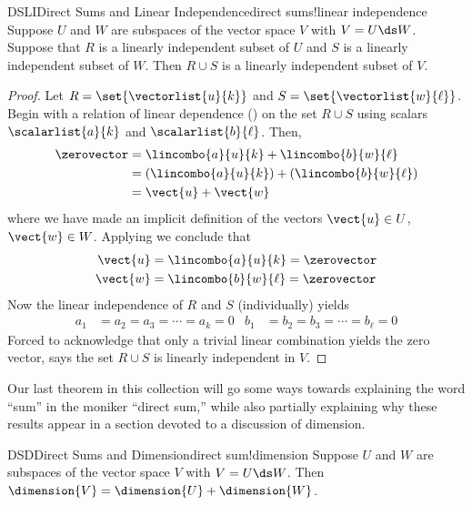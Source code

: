 %
\begin{theorem}{DSLI}{Direct Sums and Linear Independence}{direct sums!linear independence}
Suppose $U$ and $W$ are subspaces of the vector space $V$ with $V=U\ds W$.  Suppose that $R$ is a linearly independent subset of $U$ and $S$ is a linearly independent subset of $W$.  Then $R\cup S$ is a linearly independent subset of $V$.
\end{theorem}
%
\begin{proof}
Let $R=\set{\vectorlist{u}{k}}$ and $S=\set{\vectorlist{w}{\ell}}$.  Begin with a relation of linear dependence () on the set $R\cup S$ using scalars $\scalarlist{a}{k}$ and $\scalarlist{b}{\ell}$.  Then,
%
\begin{align*}
\zerovector
&=
\lincombo{a}{u}{k}
+
\lincombo{b}{w}{\ell}\\
&=
\left(\lincombo{a}{u}{k}\right)
+
\left(\lincombo{b}{w}{\ell}\right)\\
&=\vect{u}+\vect{w}
\end{align*}
%
where we have made an implicit definition of the vectors $\vect{u}\in U$, $\vect{w}\in W$.  Applying  we conclude that
%
\begin{align*}
\vect{u}&=\lincombo{a}{u}{k}=\zerovector\\
\vect{w}&=\lincombo{b}{w}{\ell}=\zerovector
\end{align*}
%
Now the linear independence of $R$ and $S$ (individually) yields
%
\begin{align*}
a_1&=a_2=a_3=\cdots=a_k=0
&
b_1&=b_2=b_3=\cdots=b_\ell=0
\end{align*}
%
Forced to acknowledge that only a trivial linear combination yields the zero vector,  says the set $R\cup S$ is linearly independent in $V$.
%
\end{proof}
%
Our last theorem in this collection will go some ways towards explaining the word ``sum'' in the moniker ``direct sum,''  while also partially explaining why these results appear in a section devoted to a discussion of dimension.
%
\begin{theorem}{DSD}{Direct Sums and Dimension}{direct sum!dimension}
Suppose $U$ and $W$ are subspaces of the vector space $V$ with $V=U\ds W$.  Then $\dimension{V}=\dimension{U}+\dimension{W}$.
\end{theorem}
%
